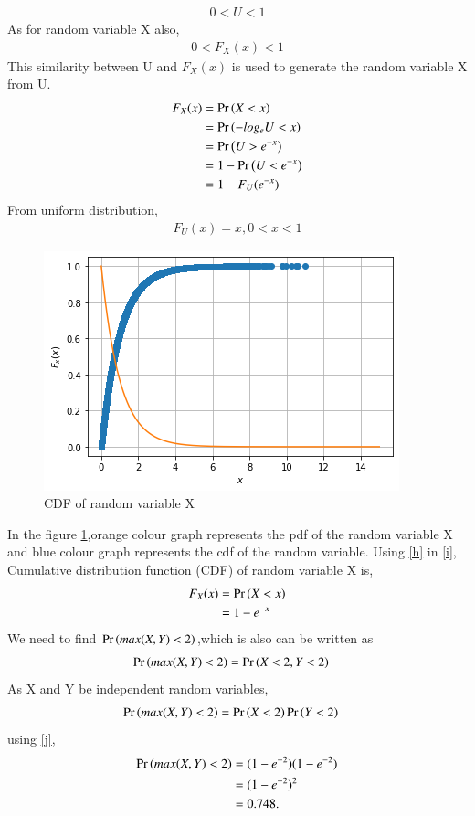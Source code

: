 \documentclass[journal,12pt,twocolumn]{IEEEtran}
\begin{document}
\begin{align}
0 < U < 1 
\end{align}
As for random variable X also,
\begin{align}
0 < F_X(x) < 1 
\end{align}
This similarity between U and $F_X(x)$ is used to generate the random variable X from U.
\begin{align}
F_X(x) &= \Pr\left(X < x\right) \\
&= \Pr\left(-log_e U < x\right)\\
&= \Pr\left(U>e^{-x}\right)\\
&= 1-\Pr\left(U<e^{-x}\right)\\
 &= 1- F_U(e^{-x})\label{h}
\end{align}
From uniform distribution,
\begin{align}
F_U(x)=x,0<x<1 \label{i}
\end{align}
\begin{figure}[ht]
    \centering
    \includegraphics[width=\columnwidth]{assign_4.png}
    \caption{CDF  of random variable X}
\label{fig_1}
\end{figure}
In the figure \ref{fig_1},orange colour graph represents the pdf of the random variable X and blue colour graph represents the cdf of the random variable. 
Using \eqref{h} in \eqref{i}, Cumulative distribution function (CDF) of random variable X is,
\begin{align}
F_X(x) &= \Pr\left(X < x\right) \\
&= 1-e^{-x} \label{j}
\end{align}
We need to find $\Pr\left( max(X,Y)<2\right)$,which is also can be written as
\begin{align}
   \Pr\left(max(X,Y)<2\right) &=\Pr\left(X<2 ,Y<2\right)
\end{align}
As X and Y be independent random variables,
\begin{align}
   \Pr\left(max(X,Y)<2\right) &=\Pr\left(X<2\right)\Pr\left(Y<2\right) 
\end{align}
using \eqref{j},
\begin{align}
\Pr\left(max(X,Y)<2\right) &=(1-e^{-2})(1-e^{-2})\\
&=(1-e^{-2})^{2}\\
&=0.748.
\end{align}
\end{document}
